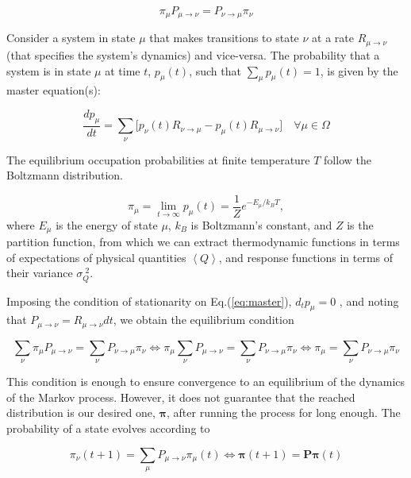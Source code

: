 \begin{equation}\label{eq:detBal}
\pi_\mu P_{\mu \rightarrow \nu} = P_{\nu \rightarrow \mu} \pi_\nu
\end{equation}

Consider a system in state $\mu$ that makes transitions to state $\nu$ at a rate $R_{\mu \rightarrow  \nu}$ (that specifies the system's dynamics) and vice-versa.
The probability that a system is in state $\mu$ at time $t$, $p_\mu (t)$, such that $\sum_\mu p_\mu (t) = 1$, is given by the master equation(s):

\begin{equation}\label{eq:master}
\frac{d p_\mu}{dt} = \sum_\nu \big[ p_\nu (t) R_{\nu \rightarrow \mu} - p_\mu (t) R_{\mu \rightarrow \nu} \big] \quad \forall \mu \in \Omega
\end{equation}

The equilibrium occupation probabilities at finite temperature $T$ follow the Boltzmann distribution.

\begin{equation}
\pi_\mu = \lim_{t \rightarrow \infty} p_\mu (t) = \frac{1}{Z} e^{ - E_\mu / k_B T} ,
\end{equation}
where $E_\mu$ is the energy of state $\mu$, $k_B$ is Boltzmann's constant, and $Z$ is the partition function, from which we can extract thermodynamic functions in terms of expectations of physical quantities $\left\langle Q \right\rangle$, and response functions in terms of their variance $\sigma_Q^{\,\, 2}$.

Imposing the condition of stationarity on Eq.(\ref{eq:master}), $d_t p_\mu = 0$ , and noting that $ P_{\mu\rightarrow \nu} = R_{\mu\rightarrow \nu}  dt$, we obtain the equilibrium condition

\begin{equation}\label{eq:equilibrium}
\sum_\nu \pi_\mu P_{\mu \rightarrow \nu} = \sum_\nu P_{\nu \rightarrow \mu} \pi_\nu \iff \pi_\mu \sum_\nu P_{\mu \rightarrow \nu} = \sum_\nu P_{\nu \rightarrow \mu} \pi_\nu \iff \pi_\mu = \sum_\nu P_{\nu \rightarrow \mu} \pi_\nu
\end{equation}

This condition is enough to ensure convergence to an equilibrium of the dynamics of the Markov process.
However, it does not guarantee that the reached distribution is our desired one, $\bm \pi$, after running the process for long enough.
The probability of a state evolves according to

\begin{equation}
\pi_\nu ( t + 1 ) = \sum_\mu P_{\mu\rightarrow\nu}  \pi_\mu ( t ) \iff \bm \pi ( t + 1 ) = \bm P \bm \pi ( t )
\end{equation}

